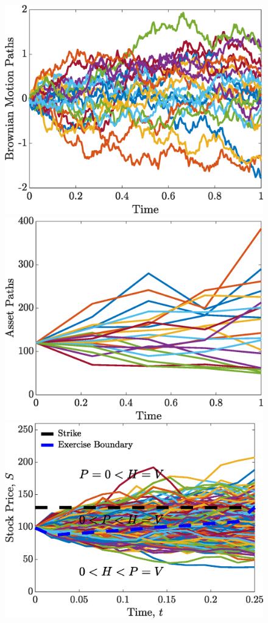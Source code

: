 \begin{figure}
  \begin{center}
    \includegraphics[scale =  0.2 ]{BrownianMotionPaths.eps}
    \includegraphics[scale =  0.2]{AssetPaths.eps}
    \includegraphics[scale =  0.2]{AmerPutPathsExer.eps} 

\end{center}
\end{figure}
